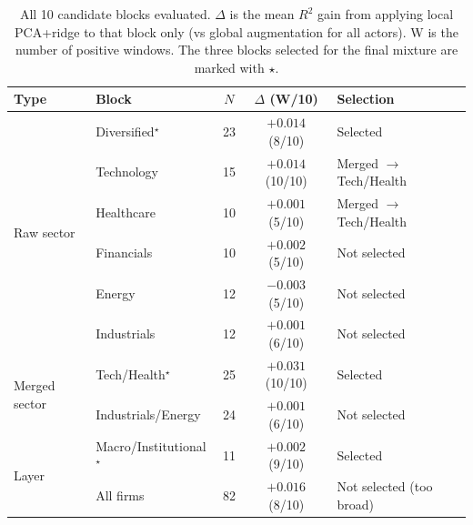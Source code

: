 \documentclass[11pt,a4paper]{article}
\begin{document}
\begin{table}[H]
\centering
\caption{All 10 candidate blocks evaluated. $\Delta$ is the mean $R^2$ gain from applying local PCA+ridge to that block only (vs global augmentation for all actors). W is the number of positive windows. The three blocks selected for the final mixture are marked with $\star$.}
\label{tab:candidates}
\small
\begin{tabular}{llccl}
\toprule
Type & Block & $N$ & $\Delta$ (W/10) & Selection \\
\midrule
\multirow{6}{*}{Raw sector}
& Diversified$^\star$ & 23 & $+0.014$ (8/10) & Selected \\
& Technology & 15 & $+0.014$ (10/10) & Merged $\rightarrow$ Tech/Health \\
& Healthcare & 10 & $+0.001$ (5/10) & Merged $\rightarrow$ Tech/Health \\
& Financials & 10 & $+0.002$ (5/10) & Not selected \\
& Energy & 12 & $-0.003$ (5/10) & Not selected \\
& Industrials & 12 & $+0.001$ (6/10) & Not selected \\
\midrule
\multirow{2}{*}{Merged sector}
& Tech/Health$^\star$ & 25 & $+0.031$ (10/10) & Selected \\
& Industrials/Energy & 24 & $+0.001$ (6/10) & Not selected \\
\midrule
\multirow{2}{*}{Layer}
& Macro/Institutional$^\star$ & 11 & $+0.002$ (9/10) & Selected \\
& All firms & 82 & $+0.016$ (8/10) & Not selected (too broad) \\
\bottomrule
\end{tabular}
\end{table}
\end{document}
